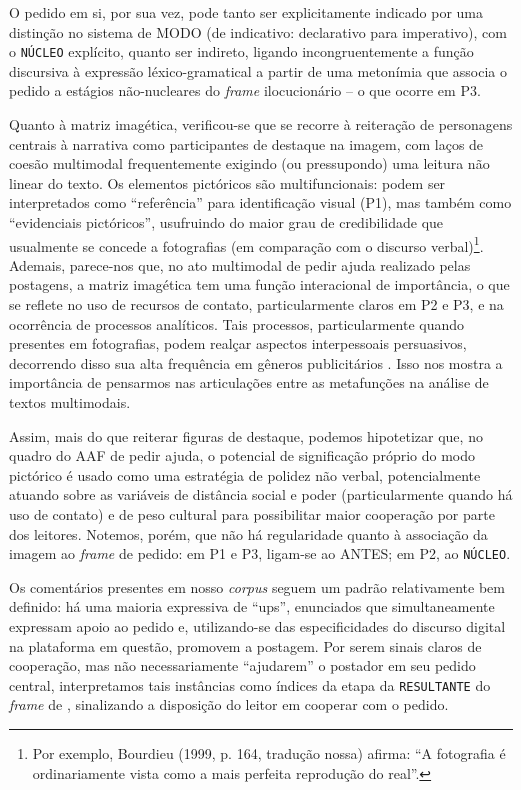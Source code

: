 \documentclass{textolivre-html}
\begin{document}
O pedido em si, por sua vez, pode tanto ser explicitamente indicado por uma distinção no sistema de MODO (de indicativo: declarativo para imperativo), com o \texttt{NÚCLEO} explícito, quanto ser indireto, ligando incongruentemente a função discursiva à expressão léxico-gramatical a partir de uma metonímia que associa o pedido a estágios não-nucleares do \textit{frame} ilocucionário – o que ocorre em P3.

Quanto à matriz imagética, verificou-se que se recorre à reiteração de personagens centrais à narrativa como participantes de destaque na imagem, com laços de coesão multimodal frequentemente exigindo (ou pressupondo) uma leitura não linear do texto. Os elementos pictóricos são multifuncionais: podem ser interpretados como “referência” para identificação visual (P1), mas também como “evidenciais pictóricos”, usufruindo do maior grau de credibilidade que usualmente se concede a fotografias (em comparação com o discurso verbal)\footnote{Por exemplo, Bourdieu (1999, p. 164, tradução nossa) afirma: “A fotografia é ordinariamente vista como a mais perfeita reprodução do real”.}. Ademais, parece-nos que, no ato multimodal de pedir ajuda realizado pelas postagens, a matriz imagética tem uma função interacional de importância, o que se reflete no uso de recursos de contato, particularmente claros em P2 e P3, e na ocorrência de processos analíticos. Tais processos, particularmente quando presentes em fotografias, podem realçar aspectos interpessoais persuasivos, decorrendo disso sua alta frequência em gêneros publicitários \cite[p. 89--90]{kress2006}. Isso nos mostra a importância de pensarmos nas articulações entre as metafunções na análise de textos multimodais.

Assim, mais do que reiterar figuras de destaque, podemos hipotetizar que, no quadro do AAF de pedir ajuda, o potencial de significação próprio do modo pictórico é usado como uma estratégia de polidez não verbal, potencialmente atuando sobre as variáveis de distância social e poder (particularmente quando há uso de contato) e de peso cultural para possibilitar maior cooperação por parte dos leitores. Notemos, porém, que não há regularidade quanto à associação da imagem ao \textit{frame} de pedido: em P1 e P3, ligam-se ao ANTES; em P2, ao \texttt{NÚCLEO}.

Os comentários presentes em nosso \textit{corpus} seguem um padrão relativamente bem definido: há uma maioria expressiva de “ups”, enunciados que simultaneamente expressam apoio ao pedido e, utilizando-se das especificidades do discurso digital na plataforma em questão, promovem a postagem. Por serem sinais claros de cooperação, mas não necessariamente “ajudarem” o postador em seu pedido central, interpretamos tais instâncias como índices da etapa da \texttt{RESULTANTE} do \textit{frame} de \textcite{panther2017}, sinalizando a disposição do leitor em cooperar com o pedido.
\end{document}
